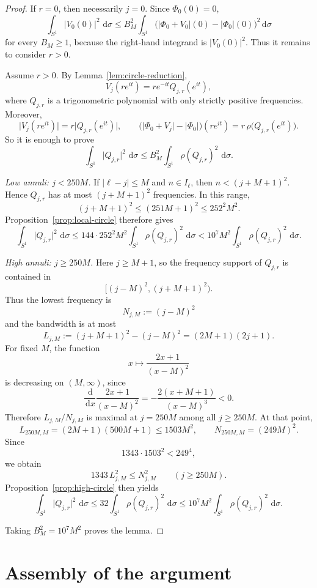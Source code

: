\documentclass[11pt]{amsart}
\theoremstyle{remark}
\newcommand{\abs}[1]{\lvert #1 \rvert}
\newcommand{\dd}{\,\mathrm{d}}
\newcommand{\rhoFn}{\rho}
\begin{document}
\begin{proof}
If $r=0$, then necessarily $j=0$. Since $\Phi_0(0)=0$,
\[
\int_{S^1} \abs{V_0(0)}^2\,\dd \sigma
\le
B_M^2 \int_{S^1}
\bigl(\abs{\Phi_0 + V_0}(0) - \abs{\Phi_0}(0)\bigr)^2
\dd \sigma
\]
for every $B_M \ge 1$, because the right-hand integrand is
$\abs{V_0(0)}^2$. Thus it remains to consider $r>0$.

Assume $r>0$. By Lemma~\ref{lem:circle-reduction},
\[
V_j(re^{it}) = r e^{-it} Q_{j,r}(e^{it}),
\]
where $Q_{j,r}$ is a trigonometric polynomial with only strictly positive
frequencies. Moreover,
\[
\abs{V_j(re^{it})} = r\abs{Q_{j,r}(e^{it})},
\qquad
\bigl(\abs{\Phi_0 + V_j} - \abs{\Phi_0}\bigr)(re^{it})
=
r\,\rhoFn\bigl(Q_{j,r}(e^{it})\bigr).
\]
So it is enough to prove
\[
\int_{S^1} \abs{Q_{j,r}}^2\,\dd \sigma
\le
B_M^2 \int_{S^1} \rhoFn(Q_{j,r})^2\,\dd \sigma.
\]

\emph{Low annuli: $j < 250M$.}
If $\abs{\ell-j}\le M$ and $n \in I_\ell$, then
$n < (j+M+1)^2$. Hence $Q_{j,r}$ has at most $(j+M+1)^2$ frequencies. In
this range,
\[
(j+M+1)^2 \le (251M+1)^2 \le 252^2 M^2.
\]
Proposition~\ref{prop:local-circle} therefore gives
\[
\int_{S^1} \abs{Q_{j,r}}^2\,\dd \sigma
\le
144 \cdot 252^2 M^2 \int_{S^1} \rhoFn(Q_{j,r})^2\,\dd \sigma
<
10^7 M^2 \int_{S^1} \rhoFn(Q_{j,r})^2\,\dd \sigma.
\]

\emph{High annuli: $j \ge 250M$.}
Here $j \ge M+1$, so the frequency support of $Q_{j,r}$ is contained in
\[
[(j-M)^2,(j+M+1)^2).
\]
Thus the lowest frequency is
\[
N_{j,M} := (j-M)^2
\]
and the bandwidth is at most
\[
L_{j,M}
:=
(j+M+1)^2 - (j-M)^2
=
(2M+1)(2j+1).
\]
For fixed $M$, the function
\[
x \mapsto \frac{2x+1}{(x-M)^2}
\]
is decreasing on $(M,\infty)$, since
\[
\frac{\dd}{\dd x}\frac{2x+1}{(x-M)^2}
=
-\frac{2(x+M+1)}{(x-M)^3}
<
0.
\]
Therefore $L_{j,M}/N_{j,M}$ is maximal at $j=250M$ among all $j \ge 250M$. At
that point,
\[
L_{250M,M}
=
(2M+1)(500M+1)
\le
1503 M^2,
\qquad
N_{250M,M} = (249M)^2.
\]
Since
\[
1343 \cdot 1503^2 < 249^4,
\]
we obtain
\[
1343\,L_{j,M}^2 \le N_{j,M}^2
\qquad
(j \ge 250M).
\]
Proposition~\ref{prop:high-circle} then yields
\[
\int_{S^1} \abs{Q_{j,r}}^2\,\dd \sigma
\le
32 \int_{S^1} \rhoFn(Q_{j,r})^2\,\dd \sigma
\le
10^7 M^2 \int_{S^1} \rhoFn(Q_{j,r})^2\,\dd \sigma.
\]

Taking $B_M^2 = 10^7 M^2$ proves the lemma.
\end{proof}

\section{Assembly of the argument}
\end{document}
